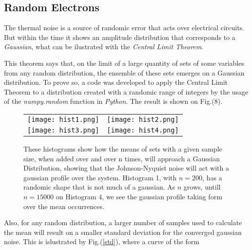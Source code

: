 \documentclass{article}
\begin{document}
{\subsection{Random Electrons}

The thermal noise is a source of randomic error that acts over
electrical circuits. But within the time it shows an amplitude
distribution that corresponds to a  \emph{Gaussian}, what can be
ilustrated with the \emph{Central Limit Theorem}. 

This theorem says that, on the limit of a large quantity of 
sets of some variables from any random distribution, the ensemble of
these sets emerges on a Gaussian distribution. To prove so, a code 
was developed to apply the Central Limit Theorem 
to a distribution created with a randomic range of integers 
by the usage of the \emph{numpy.random} function in \emph{Python}.
The result is shown on Fig.(8).

\begin{figure}[ht]

  \centering

  \begin{tabular}{cc}


    \texttt{[image: hist1.png]}&

    \texttt{[image: hist2.png]}\\

    \texttt{[image: hist3.png]}&

    \texttt{[image: hist4.png]}\\

  \end{tabular}

  \label{hists}\caption{These histograms show how the means
    of sets with a given sample size, when added over and over n times, 
  will approach a Gaussian Distribution, showing that the
  Johnson-Nyquist noise will act with a gaussian profile over the
  system. Histogram 1, with $n=200$, has a randomic shape that is not
  much of a gaussian. As $n$ grows, untill $n=15000$ on
  Histogram 4, we see the gaussian profile taking form over the mean occurrences.}

\end{figure}

Also, for any random distribution, a larger number of samples used to
calculate the mean will result on a smaller standard deviation for the
converged gaussian noise. This is islustrated by Fig.(\ref{std}), where
a curve of the form 

}
\end{document}
